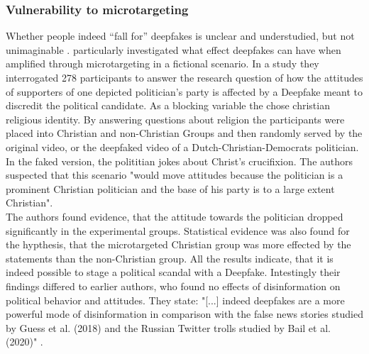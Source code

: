 \documentclass[
  a4paper,  %
  twoside,  %
  bibliography=totoc,
  headsepline,
  cleardoublepage=empty,
  parskip=half,
  draft=false
]{scrbook}
\begin{document}
\subsubsection*{Vulnerability to microtargeting}
Whether people indeed “fall for” deepfakes is unclear and understudied, but not unimaginable \cite{dobberMicrotargetedDeepfakesHave2021}. \citet{dobberMicrotargetedDeepfakesHave2021} particularly investigated what effect deepfakes can have when amplified through microtargeting in a fictional scenario. In a study they interrogated 278 participants to answer the research question of how the attitudes of supporters of one depicted politician's party is affected by a Deepfake meant to discredit the political candidate. As a blocking variable the chose christian religious identity. By answering questions about religion the participants were placed into Christian and non-Christian Groups and then randomly served by the original video, or the deepfaked video of a Dutch-Christian-Democrats politician. In the faked version, the polititian jokes about Christ's crucifixion. The authors suspected that this scenario "would move attitudes because the politician is a prominent Christian politician and the base of his party is to a large extent Christian". \\
The authors found evidence, that the attitude towards the politician dropped significantly in the experimental groups.
Statistical evidence was also found for the hypthesis, that the microtargeted Christian group was more effected by the statements than the non-Christian group. All the results indicate, that it is indeed possible to stage a political scandal with a Deepfake. Intestingly their findings differed to earlier authors, who found no effects of disinformation on political behavior and attitudes. They state: "[...] indeed deepfakes are a more powerful mode of disinformation in comparison with the false news stories studied by Guess et al. (2018) and the Russian Twitter trolls studied by Bail et al. (2020)" \cite{dobberMicrotargetedDeepfakesHave2021}.
\end{document}
